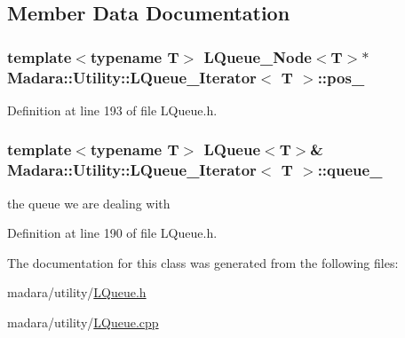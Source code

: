 \subsection{Member Data Documentation}
\hypertarget{classMadara_1_1Utility_1_1LQueue__Iterator_ae30b0711f4d78281000641ac3519bba3}{
\subsubsection[{pos\_\-}]{\setlength{\rightskip}{0pt plus 5cm}template$<$typename T$>$ {\bf LQueue\_\-Node}$<$T$>$$\ast$ {\bf Madara::Utility::LQueue\_\-Iterator}$<$ T $>$::{\bf pos\_\-}}}
\label{df/dbb/classMadara_1_1Utility_1_1LQueue__Iterator_ae30b0711f4d78281000641ac3519bba3}


Definition at line 193 of file LQueue.h.

\hypertarget{classMadara_1_1Utility_1_1LQueue__Iterator_a5c256229e5aac5c26de7d3db9346b11f}{
\subsubsection[{queue\_\-}]{\setlength{\rightskip}{0pt plus 5cm}template$<$typename T$>$ {\bf LQueue}$<$T$>$\& {\bf Madara::Utility::LQueue\_\-Iterator}$<$ T $>$::{\bf queue\_\-}}}
\label{df/dbb/classMadara_1_1Utility_1_1LQueue__Iterator_a5c256229e5aac5c26de7d3db9346b11f}


the queue we are dealing with 



Definition at line 190 of file LQueue.h.



The documentation for this class was generated from the following files:\begin{DoxyCompactItemize}
\item 
madara/utility/\hyperlink{LQueue_8h}{LQueue.h}\item 
madara/utility/\hyperlink{LQueue_8cpp}{LQueue.cpp}\end{DoxyCompactItemize}
